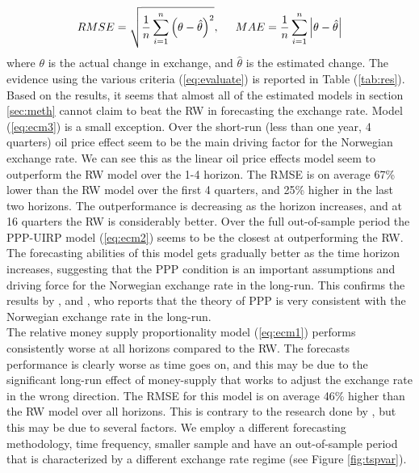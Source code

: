 \documentclass[10pt]{article}
\numberwithin{equation}{section}
\numberwithin{table}{section}
\numberwithin{figure}{section}
\begin{document}
\begin{spacing}{1.5}
\begin{align}
    RMSE = \sqrt{\frac{1}{n}\sum_{i=1}^n\left( \theta - \hat{\theta}\right)^2}, \hspace*{0,5cm} MAE = \frac{1}{n}\sum_{i=1}^n \left| \theta - \hat{\theta} \right|
    \label{eq:evaluate}
\end{align}
\noindent where $\theta$ is the actual change in exchange, and $\hat{\theta}$ is the estimated change. The evidence using the various criteria (\ref{eq:evaluate}) is reported in Table (\ref{tab:res}). Based on the results, it seems that almost all of the estimated models in section \ref{sec:meth} cannot claim to beat the RW in forecasting the exchange rate. Model (\ref{eq:ecm3}) is a small exception. Over the short-run (less than one year, 4 quarters) oil price effect seem to be the main driving factor for the Norwegian exchange rate. We can see this as the linear oil price effects model seem to outperform the RW model over the 1-4 horizon. The RMSE is on average 67\% lower than the RW model over the first 4 quarters, and 25\% higher in the last two horizons. The outperformance is decreasing as the horizon increases, and at 16 quarters the RW is considerably better. Over the full out-of-sample period the PPP-UIRP model (\ref{eq:ecm2}) seems to be the closest at outperforming the RW. The forecasting abilities of this model gets gradually better as the time horizon increases, suggesting that the PPP condition is an important assumptions and driving force for the Norwegian exchange rate in the long-run. This confirms the results by \cite{akram2000ppp}, \cite{akram2002ppp,akram2006ppp} and \cite{nordbo2004ppp}, who reports that the theory of PPP is very consistent with the Norwegian exchange rate in the long-run.\\
\indent The relative money supply proportionality model (\ref{eq:ecm1}) performs consistently worse at all horizons compared to the RW. The forecasts performance is clearly worse as time goes on, and this may be due to the significant long-run effect of money-supply that works to adjust the exchange rate in the wrong direction. The RMSE for this model is on average 46\% higher than the RW model over all horizons. This is contrary to the research done by \cite{reinton1999out}, but this may be due to several factors. We employ a different forecasting methodology, time frequency, smaller sample and have an out-of-sample period that is characterized by a different exchange rate regime (see Figure \ref{fig:tspvar}).  
\newpage
{}
\begin{figure}[h!]

\end{figure}
\end{spacing}
\end{document}
